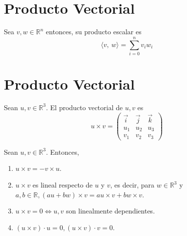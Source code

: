 \section{Producto Vectorial}

\begin{defn}
  Sea $v, w \in \mathbb{R}^{n}$ entonces, su producto escalar es
  \[ 
    \langle v{ , \ }w \rangle = \sum_{i=0}^{n} v_{i} w_{i}
  \] 
\end{defn}

\section{Producto Vectorial}

\begin{defn}
  Sean $u, v \in \mathbb{R}^{3}$. El producto vectorial de $u, v$ es
  \[ 
    u \times v = 
    \begin{pmatrix}
       \vec{i} & \vec{j} & \vec{k}\\
       u_{1} & u_{2} & u_{3}\\
       v_{1} & v_{2} & v_{3}
    \end{pmatrix}
  \] 
\end{defn}

\begin{prop}
  Sean $u, v \in \mathbb{R}^{3}$. Entonces,
  \begin{enumerate}[label=(\roman*)]
    \item $u \times v = -v \times u$.
    \item $u \times v$ es lineal respecto de $u$ y $v$, es decir, para $w \in \mathbb{R}^{3}$ y $a, b \in \mathbb{R}, (au + bw) \times v = au \times v + bw \times v$.
    \item $u \times v = 0 \Leftrightarrow u, v$ son linealmente dependientes.
    \item $(u \times v) \cdot u = 0, (u \times v) \cdot v = 0$.
  \end{enumerate}
\end{prop}

